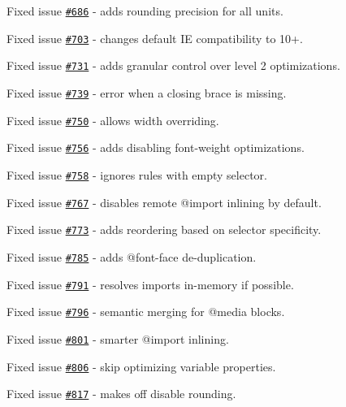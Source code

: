 \begin{DoxyItemize}
\item Fixed issue \href{https://github.com/jakubpawlowicz/clean-css/issues/686}{\tt \#686} -\/ adds rounding precision for all units.
\item Fixed issue \href{https://github.com/jakubpawlowicz/clean-css/issues/703}{\tt \#703} -\/ changes default IE compatibility to 10+.
\item Fixed issue \href{https://github.com/jakubpawlowicz/clean-css/issues/731}{\tt \#731} -\/ adds granular control over level 2 optimizations.
\item Fixed issue \href{https://github.com/jakubpawlowicz/clean-css/issues/739}{\tt \#739} -\/ error when a closing brace is missing.
\item Fixed issue \href{https://github.com/jakubpawlowicz/clean-css/issues/750}{\tt \#750} -\/ allows {\ttfamily width} overriding.
\item Fixed issue \href{https://github.com/jakubpawlowicz/clean-css/issues/756}{\tt \#756} -\/ adds disabling font-\/weight optimizations.
\item Fixed issue \href{https://github.com/jakubpawlowicz/clean-css/issues/758}{\tt \#758} -\/ ignores rules with empty selector.
\item Fixed issue \href{https://github.com/jakubpawlowicz/clean-css/issues/767}{\tt \#767} -\/ disables remote {\ttfamily @import} inlining by default.
\item Fixed issue \href{https://github.com/jakubpawlowicz/clean-css/issues/773}{\tt \#773} -\/ adds reordering based on selector specificity.
\item Fixed issue \href{https://github.com/jakubpawlowicz/clean-css/issues/785}{\tt \#785} -\/ adds {\ttfamily @font-\/face} de-\/duplication.
\item Fixed issue \href{https://github.com/jakubpawlowicz/clean-css/issues/791}{\tt \#791} -\/ resolves imports in-\/memory if possible.
\item Fixed issue \href{https://github.com/jakubpawlowicz/clean-css/issues/796}{\tt \#796} -\/ semantic merging for {\ttfamily @media} blocks.
\item Fixed issue \href{https://github.com/jakubpawlowicz/clean-css/issues/801}{\tt \#801} -\/ smarter {\ttfamily @import} inlining.
\item Fixed issue \href{https://github.com/jakubpawlowicz/clean-css/issues/806}{\tt \#806} -\/ skip optimizing variable properties.
\item Fixed issue \href{https://github.com/jakubpawlowicz/clean-css/issues/817}{\tt \#817} -\/ makes {\ttfamily off} disable rounding.

\end{DoxyItemize}
